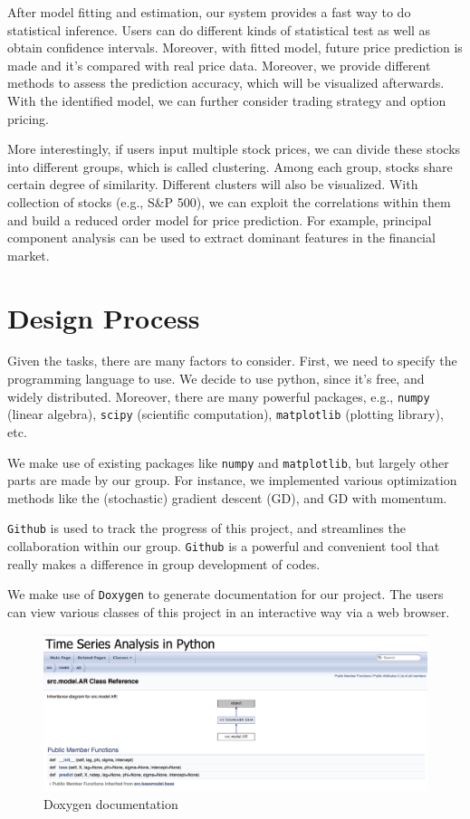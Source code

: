 \documentclass[12pt,a4paper]{article}
\begin{document}
After model fitting and estimation, our system provides a fast way to do statistical inference. Users can do different kinds of statistical test as well as obtain confidence intervals. Moreover, with fitted model, future price prediction is made and it’s compared with real price data. Moreover, we provide different methods to assess the prediction accuracy, which will be visualized afterwards. With the identified model, we can further consider trading strategy and option pricing.

More interestingly, if users input multiple stock prices, we can divide these stocks into different groups, which is called clustering. Among each group, stocks share certain degree of similarity. Different clusters will also be visualized. With collection of stocks (e.g., S\&P 500), we can exploit the correlations within them and build a reduced order model for price prediction. For example, principal component analysis can be used to extract dominant features in the financial market.

\section{Design Process}
Given the tasks, there are many factors to consider. First, we need to specify the programming language to use. We decide to use python, since it's free, and widely distributed. Moreover, there are many powerful packages, e.g., \texttt{numpy} (linear algebra), \texttt{scipy} (scientific computation), \texttt{matplotlib} (plotting library), etc.

We make use of existing packages like \texttt{numpy} and \texttt{matplotlib}, but largely other parts are made by our group. For instance, we implemented various optimization methods like the (stochastic) gradient descent (GD), and GD with momentum.

\texttt{Github} is used to track the progress of this project, and streamlines the collaboration within our group. \texttt{Github} is a powerful and convenient tool that really makes a difference in group development of codes.

We make use of \texttt{Doxygen} to generate documentation for our project. The users can view various classes of this project in an interactive way via a web browser.

\begin{figure}[H]
        \centering
     \includegraphics[width=.8\linewidth]{./Figure/Doxygen.png}
\caption{Doxygen documentation}
\end{figure}
\end{document}
